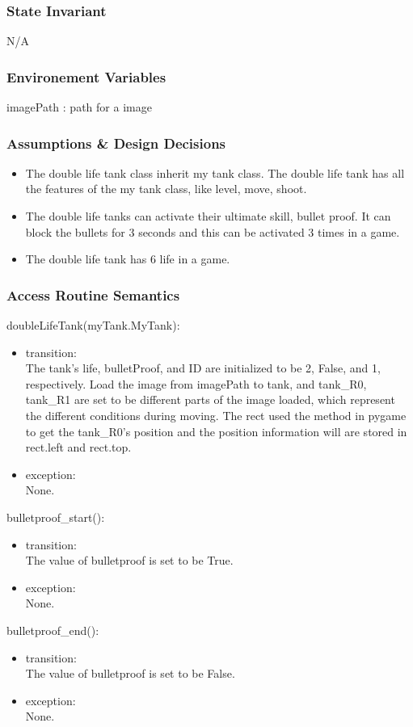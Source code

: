 \documentclass[12pt, titlepage]{article}
\begin{document}
		\subsubsection{State Invariant}
		N/A
		\subsubsection{Environement Variables}
		imagePath : path for a image
		
		\subsubsection{Assumptions \& Design Decisions}
		\begin{itemize}
		\item The double life tank class inherit my tank class. The double life tank has all the features of the my tank class, like level, move, shoot.
		
		\item The double life tanks can activate their ultimate skill, bullet proof. It can block the bullets for 3 seconds and this can be activated 3 times in a game.
		
		\item The double life tank has 6 life in a game.
		\end{itemize}
		\subsubsection{Access Routine Semantics}
	    doubleLifeTank(myTank.MyTank):
	    \begin{itemize}
	    \item transition:\\
	    The tank's life, bulletProof, and ID are initialized to be 2, False, and 1, respectively. Load the image from imagePath to tank, and tank\_R0, tank\_R1 are set to be different parts of the image loaded, which represent the different conditions during moving. The rect used the method in pygame to get the tank\_R0's position and the position information will are stored in rect.left and rect.top.
	    
	    \item exception:\\ None.
	    \end{itemize}
	    bulletproof\_start():
	    \begin{itemize}
	    \item transition:\\ The value of bulletproof is set to be True.
	    \item exception:\\ None.
	    \end{itemize}
	    bulletproof\_end():
	    \begin{itemize}
	    \item transition:\\The value of bulletproof is set to be False.
	    \item exception:\\ None.
	    \end{itemize}
	    
\end{document}
